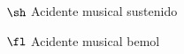 \begin{simbolos}
  \item[$ \sh $] Acidente musical sustenido
  \item[$ \fl $] Acidente musical bemol
\end{simbolos}
